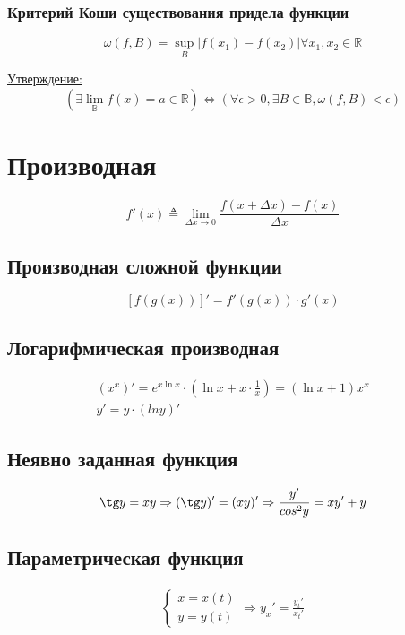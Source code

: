 \documentclass{article}
\begin{document}
\subsubsection{Критерий Коши существования придела функции}

\[
\omega(f, B) = \sup \limits_{B} |f(x_1) - f(x_2)| \forall x_1, x_2 \in \mathbb{R}
\]

\underline{Утверждение:}
\[
\left(
	\exists \lim_{\mathbb{B}} f(x) = a \in \mathbb{R}
\right) \Leftrightarrow \left(
	\forall \epsilon > 0, \exists B \in \mathbb{B}, \omega(f, B) < \epsilon
\right)
\]

\section{Производная}

\[
f'(x) \triangleq \lim_{\Delta x \to 0} \frac{f(x + \Delta x) - f(x)}{\Delta x}
\]

\subsection{Производная сложной функции}

\[
[f(g(x))]' = f'(g(x)) \cdot g'(x)
\]

\subsection{Логарифмическая производная}

\begin{gather*}
	(x^x)' = e^{x \ln x} \cdot (\ln x + x \cdot \frac{1}{x}) = (\ln x + 1) x^x \\
	y' = y \cdot (ln y)'
\end{gather*}

\subsection{Неявно заданная функция}

\[
	\tg y = xy \Rightarrow (\tg y)' = (xy)' \Rightarrow \frac{y'}{cos^2 y} = xy' + y
\]

\subsection{Параметрическая функция}

\begin{gather*}
	\begin{cases}
		x = x(t) \\
		y = y(t)
	\end{cases} \Rightarrow y_x' = \frac{y_t'}{x_t'}
\end{gather*}
\end{document}
